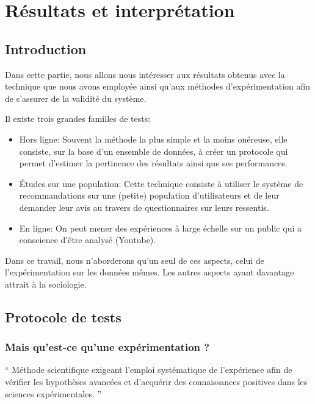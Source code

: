 \chapter{Résultats et interprétation}

\section{Introduction}

Dans cette partie, nous allons nous intéresser aux résultats obtenus avec la technique que nous avons employée ainsi qu'aux méthodes d'expérimentation afin de s'assurer de la validité du système.

Il existe trois grandes familles de tests:
\begin{itemize}
    \item Hors ligne: Souvent la méthode la plus simple et la moins onéreuse, elle consiste, sur la base d'un ensemble de données, à créer un protocole qui permet d'estimer la pertinence des résultats ainsi que ses performances.
    \item Études sur une population: Cette technique consiste à utiliser le système de recommandations sur une (petite) population d'utilisateurs et de leur demander leur avis au travers de questionnaires sur leurs ressentis.
    \item En ligne: On peut mener des expériences à large échelle sur un public qui a conscience d'être analysé (Youtube).
\end{itemize}

Dans ce travail, nous n'aborderons qu'un seul de ces aspects, celui de l'expérimentation sur les données mêmes. Les autres aspects ayant davantage attrait à la sociologie.

\section{Protocole de tests} \label{section:Test}

\subsection{Mais qu'est-ce qu'une expérimentation ?}

`` Méthode scientifique exigeant l'emploi systématique de l'expérience afin de vérifier les hypothèses avancées et d'acquérir des connaissances positives dans les sciences expérimentales. '' \cite{ATILF}

